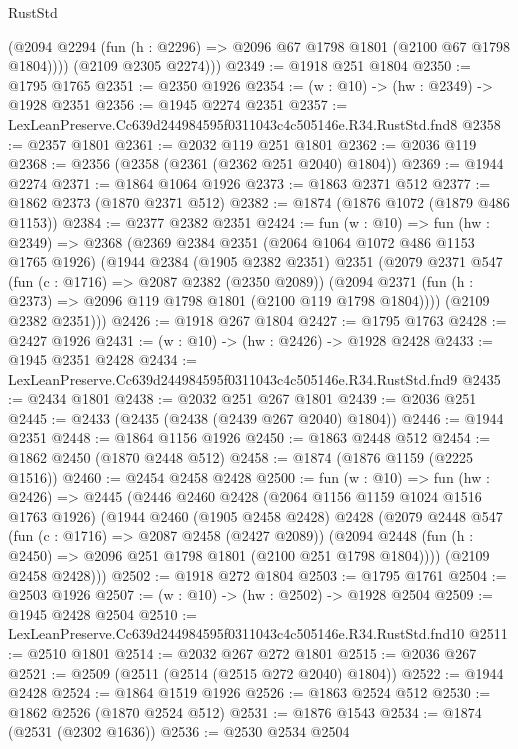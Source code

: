\begin{lexlean}{RustStd}
\begin{coremodule}
          (@2094 @2294 (fun (h : @2296) => @2096 @67 @1798 @1801 (@2100 @67 @1798 @1804))))
        (@2109 @2305 @2274)))
@2349 := @1918 @251 @1804
@2350 := @1795 @1765
@2351 := @2350 @1926
@2354 := (w : @10) -> (hw : @2349) -> @1928 @2351
@2356 := @1945 @2274 @2351
@2357 := LexLeanPreserve.Cc639d244984595f0311043c4c505146e.R34.RustStd.fnd8
@2358 := @2357 @1801
@2361 := @2032 @119 @251 @1801
@2362 := @2036 @119
@2368 := @2356 (@2358 (@2361 (@2362 @251 @2040) @1804))
@2369 := @1944 @2274
@2371 := @1864 @1064 @1926
@2373 := @1863 @2371 @512
@2377 := @1862 @2373 (@1870 @2371 @512)
@2382 := @1874 (@1876 @1072 (@1879 @486 @1153))
@2384 := @2377 @2382 @2351
@2424 := fun (w : @10) =>
  fun (hw : @2349) =>
  @2368
    (@2369
      @2384
      @2351
      (@2064 @1064 @1072 @486 @1153 @1765 @1926)
      (@1944
        @2384
        (@1905 @2382 @2351)
        @2351
        (@2079
          @2371
          @547
          (fun (c : @1716) => @2087 @2382 (@2350 @2089))
          (@2094 @2371 (fun (h : @2373) => @2096 @119 @1798 @1801 (@2100 @119 @1798 @1804))))
        (@2109 @2382 @2351)))
@2426 := @1918 @267 @1804
@2427 := @1795 @1763
@2428 := @2427 @1926
@2431 := (w : @10) -> (hw : @2426) -> @1928 @2428
@2433 := @1945 @2351 @2428
@2434 := LexLeanPreserve.Cc639d244984595f0311043c4c505146e.R34.RustStd.fnd9
@2435 := @2434 @1801
@2438 := @2032 @251 @267 @1801
@2439 := @2036 @251
@2445 := @2433 (@2435 (@2438 (@2439 @267 @2040) @1804))
@2446 := @1944 @2351
@2448 := @1864 @1156 @1926
@2450 := @1863 @2448 @512
@2454 := @1862 @2450 (@1870 @2448 @512)
@2458 := @1874 (@1876 @1159 (@2225 @1516))
@2460 := @2454 @2458 @2428
@2500 := fun (w : @10) =>
  fun (hw : @2426) =>
  @2445
    (@2446
      @2460
      @2428
      (@2064 @1156 @1159 @1024 @1516 @1763 @1926)
      (@1944
        @2460
        (@1905 @2458 @2428)
        @2428
        (@2079
          @2448
          @547
          (fun (c : @1716) => @2087 @2458 (@2427 @2089))
          (@2094 @2448 (fun (h : @2450) => @2096 @251 @1798 @1801 (@2100 @251 @1798 @1804))))
        (@2109 @2458 @2428)))
@2502 := @1918 @272 @1804
@2503 := @1795 @1761
@2504 := @2503 @1926
@2507 := (w : @10) -> (hw : @2502) -> @1928 @2504
@2509 := @1945 @2428 @2504
@2510 := LexLeanPreserve.Cc639d244984595f0311043c4c505146e.R34.RustStd.fnd10
@2511 := @2510 @1801
@2514 := @2032 @267 @272 @1801
@2515 := @2036 @267
@2521 := @2509 (@2511 (@2514 (@2515 @272 @2040) @1804))
@2522 := @1944 @2428
@2524 := @1864 @1519 @1926
@2526 := @1863 @2524 @512
@2530 := @1862 @2526 (@1870 @2524 @512)
@2531 := @1876 @1543
@2534 := @1874 (@2531 (@2302 @1636))
@2536 := @2530 @2534 @2504

\end{coremodule}
\end{lexlean}
